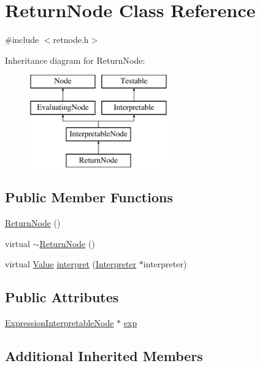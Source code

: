 \hypertarget{classReturnNode}{}\section{Return\+Node Class Reference}
\label{classReturnNode}


{\ttfamily \#include $<$retnode.\+h$>$}

Inheritance diagram for Return\+Node\+:\begin{figure}[H]
\begin{center}
\leavevmode
\includegraphics[height=4.000000cm]{classReturnNode}
\end{center}
\end{figure}
\subsection*{Public Member Functions}
\begin{DoxyCompactItemize}
\item 
\hyperlink{classReturnNode_a1e79c04a4e82c37af4aafa39be12b3ba}{Return\+Node} ()
\item 
virtual \hyperlink{classReturnNode_ab6ad8adf03f6c24bf9d717c6f1af7bcb}{$\sim$\+Return\+Node} ()
\item 
virtual \hyperlink{classValue}{Value} \hyperlink{classReturnNode_ae6c35829787a4f880b3ee1fa4b2e98d3}{interpret} (\hyperlink{classInterpreter}{Interpreter} $\ast$interpreter)
\end{DoxyCompactItemize}
\subsection*{Public Attributes}
\begin{DoxyCompactItemize}
\item 
\hyperlink{classExpressionInterpretableNode}{Expression\+Interpretable\+Node} $\ast$ \hyperlink{classReturnNode_a27f21d586d90935184261ea34cf2a253}{exp}
\end{DoxyCompactItemize}
\subsection*{Additional Inherited Members}


